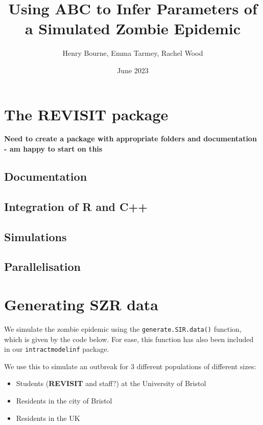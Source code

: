 \documentclass[
]{article}
\title{Using ABC to Infer Parameters of a Simulated Zombie Epidemic}
\author{Henry Bourne, Emma Tarmey, Rachel Wood}
\date{June 2023}
\providecommand{\tightlist}{%
  \setlength{\itemsep}{0pt}\setlength{\parskip}{0pt}}
\begin{document}
\maketitle

\hypertarget{the-revisit-package}{%
\section{The REVISIT package}\label{the-revisit-package}}

\textbf{Need to create a package with appropriate folders and documentation - am happy to start on this}

\hypertarget{documentation}{%
\subsection{Documentation}\label{documentation}}

\hypertarget{integration-of-r-and-c}{%
\subsection{Integration of R and C++}\label{integration-of-r-and-c}}

\hypertarget{simulations}{%
\subsection{Simulations}\label{simulations}}

\hypertarget{parallelisation}{%
\subsection{Parallelisation}\label{parallelisation}}

\hypertarget{generating-szr-data}{%
\section{Generating SZR data}\label{generating-szr-data}}

We simulate the zombie epidemic using the \texttt{generate.SIR.data()}
function, which is given by the code below. For ease, this function has
also been included in our \texttt{intractmodelinf} package.

We use this to simulate an outbreak for 3 different populations of
different sizes:

\begin{itemize}
\tightlist
\item
  Students (\textbf{REVISIT} and staff?) at the University of Bristol
\item
  Residents in the city of Bristol
\item
  Residents in the UK
\end{itemize}
\end{document}
